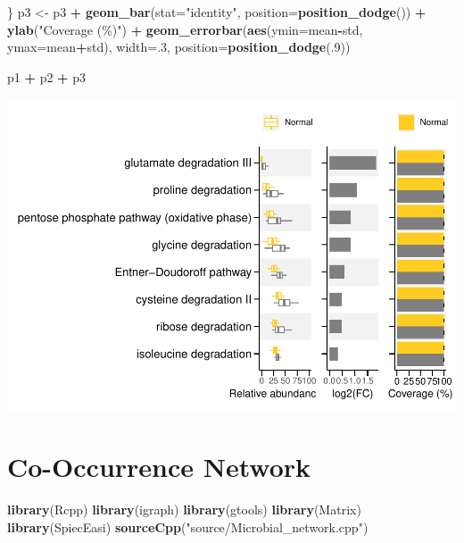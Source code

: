 \documentclass[
]{article}
\newenvironment{Shaded}{\begin{snugshade}}{\end{snugshade}}
\newcommand{\AttributeTok}[1]{\textcolor[rgb]{0.13,0.29,0.53}{#1}}
\newcommand{\DecValTok}[1]{\textcolor[rgb]{0.00,0.00,0.81}{#1}}
\newcommand{\FunctionTok}[1]{\textcolor[rgb]{0.13,0.29,0.53}{\textbf{#1}}}
\newcommand{\NormalTok}[1]{#1}
\newcommand{\OtherTok}[1]{\textcolor[rgb]{0.56,0.35,0.01}{#1}}
\newcommand{\SpecialCharTok}[1]{\textcolor[rgb]{0.81,0.36,0.00}{\textbf{#1}}}
\newcommand{\StringTok}[1]{\textcolor[rgb]{0.31,0.60,0.02}{#1}}
\begin{document}
\begin{Shaded}
\begin{Highlighting}[]
\NormalTok{\}}
\NormalTok{p3 }\OtherTok{\textless{}{-}}\NormalTok{ p3 }\SpecialCharTok{+} \FunctionTok{geom\_bar}\NormalTok{(}\AttributeTok{stat=}\StringTok{"identity"}\NormalTok{, }\AttributeTok{position=}\FunctionTok{position\_dodge}\NormalTok{()) }\SpecialCharTok{+} \FunctionTok{ylab}\NormalTok{(}\StringTok{"Coverage (\%)"}\NormalTok{) }\SpecialCharTok{+}
           \FunctionTok{geom\_errorbar}\NormalTok{(}\FunctionTok{aes}\NormalTok{(}\AttributeTok{ymin=}\NormalTok{mean}\SpecialCharTok{{-}}\NormalTok{std, }\AttributeTok{ymax=}\NormalTok{mean}\SpecialCharTok{+}\NormalTok{std), }\AttributeTok{width=}\NormalTok{.}\DecValTok{3}\NormalTok{, }\AttributeTok{position=}\FunctionTok{position\_dodge}\NormalTok{(.}\DecValTok{9}\NormalTok{)) }

\NormalTok{p1 }\SpecialCharTok{+}\NormalTok{ p2 }\SpecialCharTok{+}\NormalTok{ p3}
\end{Highlighting}
\end{Shaded}

\includegraphics{workshop_files/figure-latex/unnamed-chunk-62-1.pdf}

\hypertarget{co-occurrence-network}{%
\section{Co-Occurrence Network}\label{co-occurrence-network}}

\begin{Shaded}
\begin{Highlighting}[]
\FunctionTok{library}\NormalTok{(Rcpp)}
\FunctionTok{library}\NormalTok{(igraph) }
\FunctionTok{library}\NormalTok{(gtools)}
\FunctionTok{library}\NormalTok{(Matrix)}
\FunctionTok{library}\NormalTok{(SpiecEasi)}
\FunctionTok{sourceCpp}\NormalTok{(}\StringTok{"source/Microbial\_network.cpp"}\NormalTok{)}
\end{Highlighting}
\end{Shaded}
\end{document}
